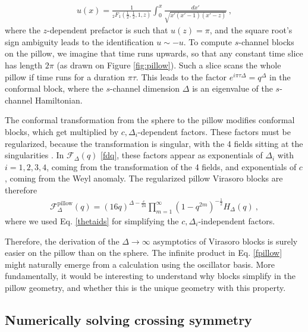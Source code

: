 \documentclass[12pt, a4paper]{article}
\theoremstyle{break}
\begin{document}
\begin{align}
 u(x) = \frac{1}{{}_2F_1\left(\tfrac12,\tfrac12,1,z\right)} \int_0^x \frac{dx'}{\sqrt{x'(x'-1)(x'-z)}} \ ,
\end{align}
where the $z$-dependent prefactor is such that $u(z)=\pi$, and the square root's sign ambiguity leads to the identification $u\sim -u$. To compute $s$-channel blocks on the pillow, we imagine that time runs upwards, so that any constant time slice has length $2\pi$ (as drawn on Figure \eqref{fig:pillow}). Such a slice scans the whole pillow if time runs for a duration $\pi\tau$. This leads to the factor $e^{i\pi\tau\Delta}=q^\Delta$ in the conformal block, where the $s$-channel dimension $\Delta$ is an eigenvalue of the $s$-channel Hamiltonian. 

The conformal transformation from the sphere to the pillow modifies conformal blocks, which get multiplied by $c,\Delta_i$-dependent factors. These factors must be regularized, because the transformation is singular, with the 4 fields sitting at the singularities \cite[Appendix D]{msz15}. In $\mathcal{F}_\Delta(q)$ \eqref{fdq}, these factors appear as exponentials of $\Delta_i$ with $i=1,2,3,4$, coming from the transformation of the 4 fields, and exponentials of $c$, coming from the Weyl anomaly. The regularized pillow Virasoro blocks are therefore 
\begin{align}
 \mathcal{F}_\Delta^\text{pillow}(q) = (16q)^{\Delta-\frac{c}{24}} \prod_{m=1}^\infty \left(1-q^{2m}\right)^{-\frac12} H_\Delta(q)\ , 
 \label{fpillow} 
\end{align}
where we used Eq. \eqref{thetaids} for simplifying the $c,\Delta_i$-independent factors. 

Therefore, the derivation of the $\Delta\to\infty$ asymptotics of Virasoro blocks is surely easier on the pillow than on the sphere. The infinite product in Eq. \eqref{fpillow} might naturally emerge from a calculation using the oscillator basis. More fundamentally, it would be interesting to understand why blocks simplify in the pillow geometry, and whether this is the unique geometry with this property. 

\subsection{Numerically solving crossing symmetry}
\end{document}
